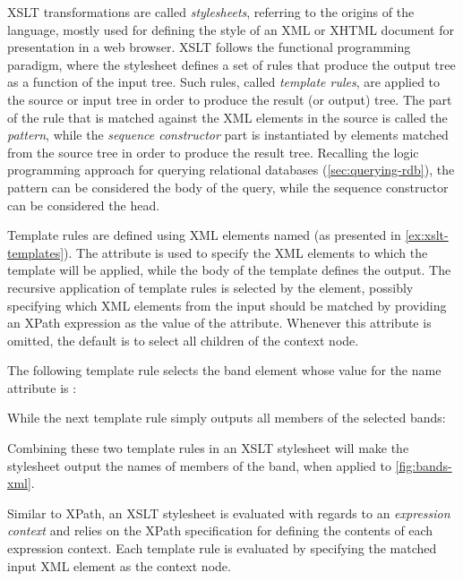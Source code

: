 \ac{XSLT} transformations are called \emph{stylesheets}, referring to the origins of the language, mostly used for
defining the style of an \ac{XML} or XHTML document for presentation in a web browser.
%
\ac{XSLT} follows the functional programming paradigm, where the stylesheet defines a set of rules that produce the output
tree as a function of the input tree.  
%
Such rules, called \emph{template rules}, are applied to the source or input tree in order to produce the result (or
output) tree.  The part of the rule that is matched against the \ac{XML} elements in the source is called the
\emph{pattern}, while the \emph{sequence constructor} part is instantiated by elements matched from the source tree in
order to produce the result tree.
%
Recalling the logic programming approach for querying relational databases (\cref{sec:querying-rdb}), the pattern
can be considered the body of the query, while the sequence constructor can be considered the head.
%


Template rules are defined using \ac{XML} elements named  (as presented in
\cref{ex:xslt-templates}).  
%
The  attribute is used to specify the \ac{XML} elements to which the template will be applied, while
the body of the template defines the output.  The recursive application of template rules is selected by the
 element, possibly specifying which \ac{XML} elements from the input
should be matched by providing an \ac{XPath} expression as the value of the  attribute.  Whenever
this attribute is omitted, the default is to select all children of the context node.
%
\begin{example}
  \label{ex:xslt-templates}
  The following template rule selects the band element whose value for the name attribute is
  :
  
  \noindent While the next template rule simply outputs all members of the selected bands:
  
  \noindent Combining these two template rules in an \ac{XSLT} stylesheet will make the stylesheet output the names of
  members of the  band, when applied to \cref{fig:bands-xml}.
\end{example}
%
Similar to \ac{XPath}, an \ac{XSLT} stylesheet is evaluated with regards to an \emph{expression context} and relies on
the \ac{XPath} specification for defining the contents of each expression context.
%
Each template rule is evaluated by specifying the matched input \ac{XML} element as the context node.

